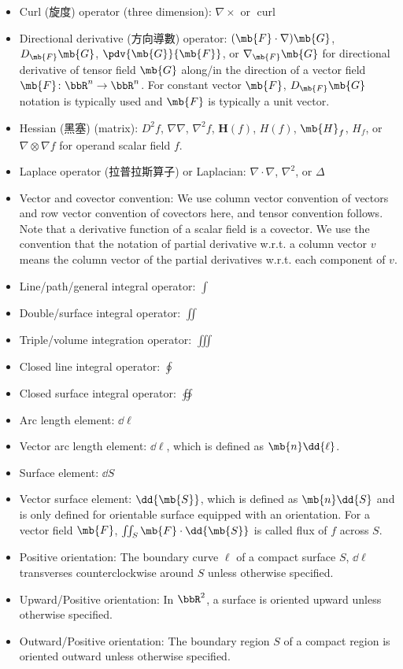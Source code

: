 \begin{itemize}
\item Curl (旋度) operator (three dimension): $\nabla\times$ or $\operatorname{curl}$
\item Directional derivative (方向導數) operator: $(\mb{F}\cdot\nabla)\mb{G}$, $D_{\mb{F}}\mb{G}$, $\pdv{\mb{G}}{\mb{F}}$, or $\nabla_{\mb{F}}\mb{G}$ for directional derivative of tensor field $\mb{G}$ along/in the direction of a vector field $\mb{F}\colon\bbR^n\to\bbR^n$. For constant vector $\mb{F}$, $D_{\mb{F}}\mb{G}$ notation is typically used and $\mb{F}$ is typically a unit vector.
\item Hessian (黑塞) (matrix): 
$D^2f$, $\nabla\nabla$, $\nabla^2f$, $\mathbf{H}(f)$, $H(f)$, $\mb{H}_f$, $H_f$, or $\nabla\otimes\nabla f$ for operand scalar field $f$.
\item Laplace operator (拉普拉斯算子) or Laplacian: $\nabla\cdot\nabla$, $\nabla^2$, or $\Delta$
\item Vector and covector convention: We use column vector convention of vectors and row vector convention of covectors here, and tensor convention follows. Note that a derivative function of a scalar field is a covector. We use the convention that the notation of partial derivative w.r.t. a column vector $v$ means the column vector of the partial derivatives w.r.t. each component of $v$.
\item Line/path/general integral operator: $\int$
\item Double/surface integral operator: $\iint$
\item Triple/volume integration operator: $\iiint$
\item Closed line integral operator: $\oint$
\item Closed surface integral operator: $\oiint$
\item Arc length element: $\dd{\ell}$
\item Vector arc length element: $\dd{\boldsymbol{\ell}}$, which is defined as $\mb{n}\dd{\ell}$.
\item Surface element: $\dd{S}$
\item Vector surface element: $\dd{\mb{S}}$, which is defined as $\mb{n}\dd{S}$ and is only defined for orientable surface equipped with an orientation. For a vector field $\mb{F}$, $\iint_S\mb{F}\cdot\dd{\mb{S}}$ is called flux of $f$ across $S$.
\item Positive orientation: The boundary curve $\ell$ of a compact surface $S$, $\dd{\boldsymbol{\ell}}$ transverses counterclockwise around $S$ unless otherwise specified.
\item Upward/Positive orientation: In $\bbR^2$, a surface is oriented upward unless otherwise specified.
\item Outward/Positive orientation: The boundary region $S$ of a compact region is oriented outward unless otherwise specified.
\end{itemize}
